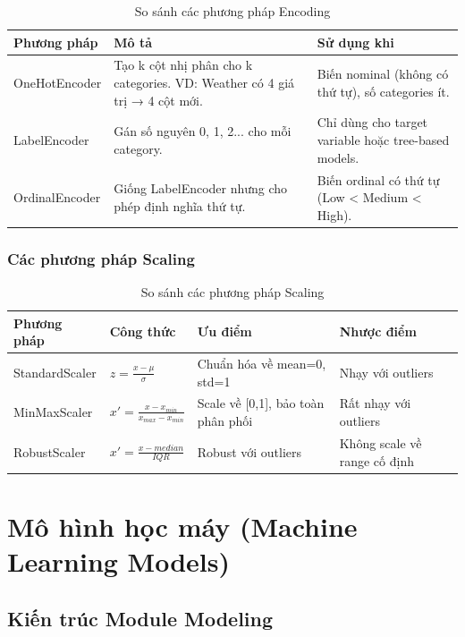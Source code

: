 \documentclass[12pt,a4paper]{article}
\begin{document}
\begin{table}[H]
\centering
\caption{So sánh các phương pháp Encoding}
\label{tab:encoding_methods}
\begin{tabular}{|l|p{5cm}|p{5.5cm}|}
\hline
\textbf{Phương pháp} & \textbf{Mô tả} & \textbf{Sử dụng khi} \\
\hline
OneHotEncoder & Tạo k cột nhị phân cho k categories. VD: Weather có 4 giá trị → 4 cột mới. & Biến nominal (không có thứ tự), số categories ít. \\
\hline
LabelEncoder & Gán số nguyên 0, 1, 2... cho mỗi category. & Chỉ dùng cho target variable hoặc tree-based models. \\
\hline
OrdinalEncoder & Giống LabelEncoder nhưng cho phép định nghĩa thứ tự. & Biến ordinal có thứ tự (Low < Medium < High). \\
\hline
\end{tabular}
\end{table}

\subsubsection{Các phương pháp Scaling}

\begin{table}[H]
\centering
\caption{So sánh các phương pháp Scaling}
\label{tab:scaling_methods}
\begin{tabular}{|l|p{3.5cm}|p{3.5cm}|p{3.5cm}|}
\hline
\textbf{Phương pháp} & \textbf{Công thức} & \textbf{Ưu điểm} & \textbf{Nhược điểm} \\
\hline
StandardScaler & $z = \frac{x - \mu}{\sigma}$ & Chuẩn hóa về mean=0, std=1 & Nhạy với outliers \\
\hline
MinMaxScaler & $x' = \frac{x - x_{min}}{x_{max} - x_{min}}$ & Scale về [0,1], bảo toàn phân phối & Rất nhạy với outliers \\
\hline
RobustScaler & $x' = \frac{x - median}{IQR}$ & Robust với outliers & Không scale về range cố định \\
\hline
\end{tabular}
\end{table}

\section{Mô hình học máy (Machine Learning Models)}

\subsection{Kiến trúc Module Modeling}
\end{document}
